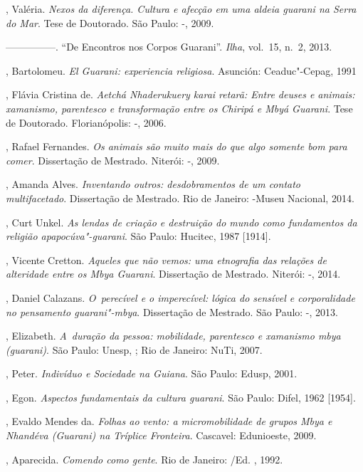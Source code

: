 \begin{Parskip}
, Valéria. \emph{Nexos da diferença. Cultura e afecção em uma aldeia
guarani na Serra do Mar}. Tese de Doutorado. São Paulo: -, 2009.

—————. ``De Encontros nos Corpos Guarani''. \emph{Ilha}, vol.~15, n.~2, 2013.

, Bartolomeu. \emph{El Guarani: experiencia religiosa}. Asunción:
Ceaduc"-Cepag, 1991

, Flávia Cristina de. \emph{Aetchá Nhaderukuery karai retarã: Entre
deuses e animais: xamanismo, parentesco e transformação entre os
Chiripá e Mbyá Guarani}. Tese de Doutorado. Florianópolis: -,
2006.

 , Rafael Fernandes. \emph{Os animais são muito mais do que algo
somente bom para comer}. Dissertação de Mestrado. Niterói: -,
2009.

, Amanda Alves. \emph{Inventando outros: desdobramentos de um contato
multifacetado}. Dissertação de Mestrado. Rio de Janeiro: -Museu
Nacional, 2014.

, Curt Unkel. \emph{As lendas de criação e destruição do mundo como
fundamentos da religião apapocúva"-guarani}. São Paulo: Hucitec, 1987
[1914].

, Vicente Cretton. \emph{Aqueles que não vemos: uma etnografia das
relações de alteridade entre os Mbya Guarani}. Dissertação de Mestrado.
Niterói: -, 2014.

, Daniel Calazans. \emph{O~perecível e o imperecível: lógica do sensível
e corporalidade no pensamento guarani"-mbya}. Dissertação de Mestrado.
São Paulo: -, 2013.

, Elizabeth. \emph{A~duração da pessoa: mobilidade, parentesco e
xamanismo mbya (guarani)}. São Paulo: Unesp, ; Rio de Janeiro: NuTi,
2007.

, Peter. \emph{Indivíduo e Sociedade na Guiana}. São Paulo: Edusp, 2001.

, Egon. \emph{Aspectos fundamentais da cultura guarani}. São Paulo:
Difel, 1962 [1954]. 

, Evaldo Mendes da. \emph{Folhas ao vento: a micromobilidade de grupos
Mbya e Nhandéva (Guarani) na Tríplice Fronteira}. Cascavel: Edunioeste,
2009.

, Aparecida. \emph{Comendo como gente}. Rio de Janeiro: /Ed. ,
1992.


\end{Parskip}

